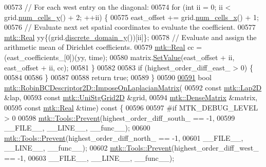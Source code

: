 \begin{DoxyCode}
00573   \textcolor{comment}{// For each west entry on the diagonal:}
00574   \textcolor{keywordflow}{for} (\textcolor{keywordtype}{int} ii = 0; ii < grid.\hyperlink{classmtk_1_1UniStgGrid2D_aed05a801cc9a76dba0ff203cea58a61a}{num\_cells\_y}() + 2; ++ii) \{
00575     east\_offset += grid.\hyperlink{classmtk_1_1UniStgGrid2D_a2d182866a398aba8e4829590e85bf939}{num\_cells\_x}() + 1;
00576     \textcolor{comment}{// Evaluate next set spatial coordinates to evaluate the coefficient.}
00577     \hyperlink{group__c01-roots_gac080bbbf5cbb5502c9f00405f894857d}{mtk::Real} yy\{(grid.\hyperlink{classmtk_1_1UniStgGrid2D_ac33a58d65105550dcf6f6b92b48b5105}{discrete\_domain\_y}())[ii]\};
00578     \textcolor{comment}{// Evaluate and assign the arithmetic mean of Dirichlet coefficients.}
00579     \hyperlink{group__c01-roots_gac080bbbf5cbb5502c9f00405f894857d}{mtk::Real} cc = (east\_coefficients\_[0])(yy, time);
00580     matrix.\hyperlink{classmtk_1_1DenseMatrix_a784ce5784109ac86bfb9d8562b334b13}{SetValue}(east\_offset + ii, east\_offset + ii, cc);
00581   \}
00582 
00583   \textcolor{keywordflow}{if} (highest\_order\_diff\_east\_ > 0) \{
00584 
00586   \}
00587 
00588   \textcolor{keywordflow}{return} \textcolor{keyword}{true};
00589 \}
00590 
\hypertarget{mtk__robin__bc__descriptor__2d_8cc_source_l00591}{}\hyperlink{classmtk_1_1RobinBCDescriptor2D_a0a26693f5265fcad978e7ba84e01ed69}{00591} \textcolor{keywordtype}{bool} \hyperlink{classmtk_1_1RobinBCDescriptor2D_a0a26693f5265fcad978e7ba84e01ed69}{mtk::RobinBCDescriptor2D::ImposeOnLaplacianMatrix}(
00592     \textcolor{keyword}{const} \hyperlink{classmtk_1_1Lap2D}{mtk::Lap2D} &lap,
00593     \textcolor{keyword}{const} \hyperlink{classmtk_1_1UniStgGrid2D}{mtk::UniStgGrid2D} &grid,
00594     \hyperlink{classmtk_1_1DenseMatrix}{mtk::DenseMatrix} &matrix,
00595     \textcolor{keyword}{const} \hyperlink{group__c01-roots_gac080bbbf5cbb5502c9f00405f894857d}{mtk::Real} &time)\textcolor{keyword}{ const }\{
00596 
00597 \textcolor{preprocessor}{  #if MTK\_DEBUG\_LEVEL > 0}
00598   \hyperlink{classmtk_1_1Tools_a332324c6f25e66be9dff48c5987a3b9f}{mtk::Tools::Prevent}(highest\_order\_diff\_south\_ == -1,
00599                       \_\_FILE\_\_, \_\_LINE\_\_, \_\_func\_\_);
00600   \hyperlink{classmtk_1_1Tools_a332324c6f25e66be9dff48c5987a3b9f}{mtk::Tools::Prevent}(highest\_order\_diff\_north\_ == -1,
00601                       \_\_FILE\_\_, \_\_LINE\_\_, \_\_func\_\_);
00602   \hyperlink{classmtk_1_1Tools_a332324c6f25e66be9dff48c5987a3b9f}{mtk::Tools::Prevent}(highest\_order\_diff\_west\_ == -1,
00603                       \_\_FILE\_\_, \_\_LINE\_\_, \_\_func\_\_);

\end{DoxyCode}
